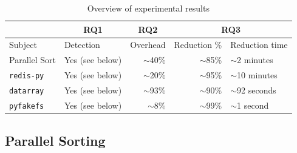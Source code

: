 \begin{table}
  \centering
  {\scriptsize
\begin{tabular}{l|l|r|r|l}
& \multicolumn{1}{c}{\bf RQ1} & \multicolumn{1}{|c|}{\bf RQ2} &
                                                              \multicolumn{2}{c}{\bf RQ3}\\
  \hline
Subject & Detection & Overhead & Reduction \%
                                                        & Reduction time\\
\hline
Parallel Sort & Yes (see below) & $\sim$40\% & $\sim$85\% & $\sim$2 minutes\\
{\tt redis-py} & Yes (see below) & $\sim$20\% & $\sim$95\% & $\sim$10 minutes\\
{\tt datarray} & Yes (see below) & $\sim$93\% & $\sim$90\% & $\sim$92
  seconds\\
{\tt pyfakefs} & Yes (see below) & $\sim$8\% & $\sim$99\% & $\sim$1 second  \\
\end{tabular}
}
\caption{Overview of experimental results}
\label{tab:overviewexp}
\end{table}

\subsection{Parallel Sorting}

